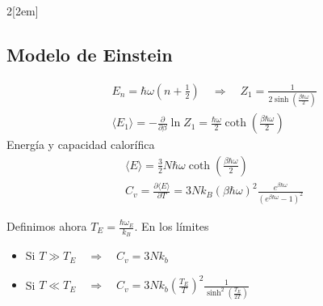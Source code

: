 \documentclass[leqno]{article}
\begin{document}
\begin{multicols}{2}[\columnsep2em]
\subsection{Modelo de Einstein}
\begin{align*}
  &E_n = \hbar \omega (n+\frac{1}{2}) \quad \Rightarrow \quad Z_1 = \frac{1}{2 \sinh(\frac{\beta \hbar \omega }{2})} \\
  &\langle E_1 \rangle = - \frac{\partial }{\partial \beta } \ln Z_1 = \frac{\hbar\omega }{2} \coth \left( \frac{\beta \hbar \omega }{2} \right) 
\end{align*}
  Energía y capacidad calorífica
\begin{align*}
&\langle E\rangle = \frac{3}{2} N \hbar \omega \coth \left( \frac{\beta \hbar \omega  }{2} \right) \\
&C_v = \frac{\partial \langle E\rangle}{\partial T}  = 3Nk_B (\beta \hbar \omega )^2 \frac{e^{\beta \hbar \omega }}{(e^{\beta \hbar \omega }-1)^2}
\end{align*}

Definimos ahora $T_E = \frac{\hbar \omega_E}{k_B}$. En los límites

\begin{itemize}[topsep=-6pt, itemsep=0pt]
  \item Si  $T\gg T_E \quad \Rightarrow \quad C_v = 3Nk_b$
  \item Si  $T\ll T_E \quad \Rightarrow \quad C_v = 3Nk_b (\frac{T_E}{T})^2 \frac{1}{\sinh ^2(\frac{T_E}{2T})}$
\end{itemize}


\end{multicols}
\end{document}
